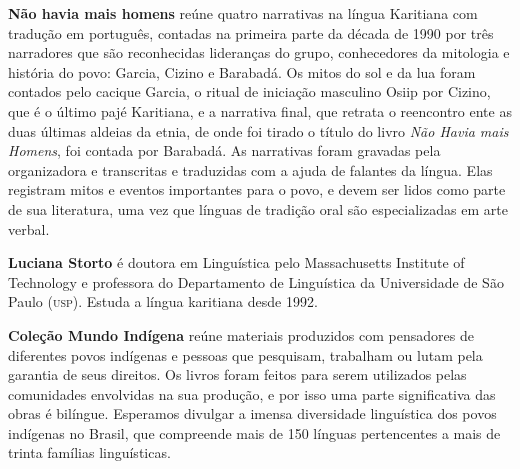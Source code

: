 \textbf{Não havia mais homens} reúne quatro narrativas na língua Karitiana com tradução em português, contadas na primeira parte da década de 1990 por três narradores que são reconhecidas lideranças do grupo, conhecedores da mitologia e história do povo: Garcia, Cizino e Barabadá. Os mitos do sol e da lua foram contados pelo cacique Garcia, o ritual de iniciação masculino Osiip por Cizino, que é o último pajé Karitiana, e a narrativa final, que retrata o reencontro ente as duas últimas aldeias da etnia, de onde foi tirado o título do livro \textit{Não Havia mais Homens}, foi contada por Barabadá. As narrativas foram gravadas pela organizadora e transcritas e traduzidas com a ajuda de falantes da língua. Elas registram mitos e eventos importantes para o povo, e devem ser lidos como parte de sua literatura, uma vez que línguas de tradição oral são especializadas em arte verbal.

\textbf{Luciana Storto} é doutora em Linguística pelo Massachusetts Institute of
Technology e professora do Departamento de Linguística da Universidade
de São Paulo (\textsc{usp}). Estuda a língua karitiana desde 1992.



\textbf{Coleção Mundo Indígena} reúne materiais produzidos com pensadores de diferentes povos indígenas e pessoas que pesquisam, trabalham ou lutam pela garantia de seus direitos. Os livros foram feitos para serem utilizados pelas comunidades envolvidas na sua produção, e por isso uma parte significativa das obras é bilíngue. Esperamos divulgar a imensa diversidade linguística dos povos indígenas no Brasil, que compreende mais de 150 línguas pertencentes a mais de trinta famílias linguísticas.


